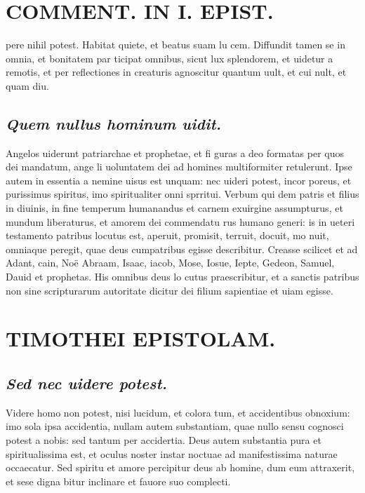 \documentclass{article}
\begin{document}
\begin{pages}
\section*{COMMENT. IN I. EPIST. }
\marginpar{[ p.178 ]}\pstart pere nihil potest. Habitat quiete, et beatus suam lu cem. Diffundit tamen se in omnia, et bonitatem par ticipat omnibus, sicut lux splendorem, et uidetur a remotis, et per reflectiones in creaturis agnoscitur quantum uult, et cui nult, et quam diu.  \pend
{}
{}
\subsection*{\textit{Quem nullus hominum uidit. }}\pstart Angelos uiderunt patriarchae et prophetae, et fi guras a deo formatas per quos dei mandatum, ange li uoluntatem dei ad homines multiformiter retulerunt. Ipse autem in essentia a nemine uisus est unquam: nec uideri potest, incor poreus, et purissimus spiritus, imo spiritualiter onni sprritui. Verbum qui dem patris et filius in diuinis, in fine temperum humanandus et carnem exuirgine assumpturus, et mundum liberaturus, et amorem dei commendatu rus humano generi: is in ueteri testamento patribus locutus est, aperuit, promisit, terruit, docuit, mo nuit, omniaque peregit, quae deus cumpatribus egisse describitur. Creasse scilicet et ad Adant, cain, Noë Abraam, Isaac, iacob, Mose, Iosue, Iepte, Gedeon, Samuel, Dauid et prophetas. His omnibus deus lo cutus praescribitur, et a sanctis patribus non sine scripturarum autoritate dicitur dei filium sapientiae et uiam egisse.  \pend
\section*{TIMOTHEI EPISTOLAM. }
\marginpar{[ p.179 ]}
{}
\subsection*{\textit{Sed nec uidere potest. }}\pstart Videre homo non potest, nisi lucidum, et colora tum, et accidentibus obnoxium: imo sola ipsa accidentia, nullam autem substantiam, quae nullo sensu cognosci potest a nobis: sed tantum per accidertia. Deus autem substantia pura et spiritualissima est, et oculus noster instar noctuae ad manifestissima naturae occaecatur. Sed spiritu et amore percipitur deus ab homine, dum eum attraxerit, et sese digna bitur inclinare et fauore suo complecti.  \pend
{}
{}

\end{pages}
\end{document}
